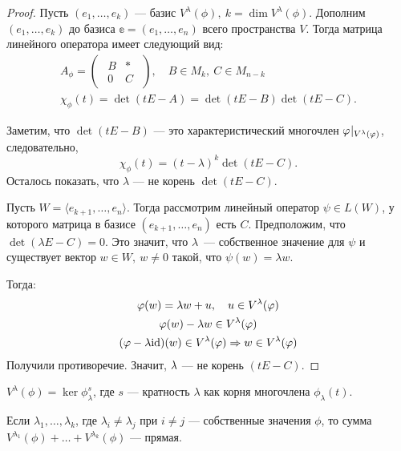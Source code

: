 \begin{proof}
	Пусть $(e_1, \ldots, e_k)$ --- базис $V^{\lambda}(\phi),\ k = \dim{V^{\lambda}(\phi)}$. Дополним $(e_1, \ldots, e_k)$  до базиса $\mathbb{e} = (e_1, \ldots, e_n)$ всего пространства $V$. Тогда матрица линейного оператора имеет следующий вид:
	\begin{gather*}
	A_\phi = 
		\begin{pmatrix}
		\begin{array}{c|c}
		B & * \\ \hline
		0 & C
		\end{array}
		\end{pmatrix},\quad B \in M_k,\ C \in M_{n-k} \\
		\chi_\phi(t) = \det(tE - A) = \det(tE - B)\det(tE - C).
	\end{gather*}
	
	Заметим, что $\det(tE - B)$ --- это характеристический многочлен ${\varphi}\negmedspace\mid_{V^\lambda(\varphi)}$, следовательно, 
	$$
	\chi_\phi(t) = (t - \lambda)^k\det(tE - C).
	$$
	Осталось показать, что $\lambda$ --- не корень $\det(tE - C)$.
	
	Пусть $W = \langle e_{k+1}, \ldots, e_n \rangle$. Тогда рассмотрим линейный оператор $\psi \in L(W)$, у которого матрица в базисе $(e_{k+1}, \ldots, e_n)$ есть $C$. Предположим, что $\det(\lambda E - C) = 0.$ Это значит, что $\lambda$~--- собственное 	значение для $\psi$ и существует вектор $w \in W,\ w \neq 0$ такой, что $\psi(w) = \lambda w$.
	
	Тогда:
	\begin{gather*}
	\varphi(w) = \lambda w + u, \quad u \in V^\lambda(\varphi) \\
	\varphi(w) - \lambda w \in V^\lambda(\varphi) \\
	(\varphi - \lambda\mathrm{id})(w) \in V^\lambda(\varphi) \Rightarrow w \in V^\lambda(\varphi)
	\end{gather*}
	Получили противоречие. Значит, $\lambda$ --- не корень $(tE - C)$.
\end{proof}

\begin{Consequence}
	$V^{\lambda}(\phi) = \ker\phi^s_\lambda$, где $s$ --- кратность $\lambda$ как корня многочлена $\phi_\lambda(t)$.
\end{Consequence}

\begin{Suggestion}
	Если $\lambda_1, \ldots, \lambda_k$, где $\lambda_i \neq \lambda_j$ при $i \neq j$ --- собственные значения $\phi$, то сумма $V^{\lambda_1}(\phi) + \ldots + V^{\lambda_k}(\phi)$ --- прямая.
\end{Suggestion}

